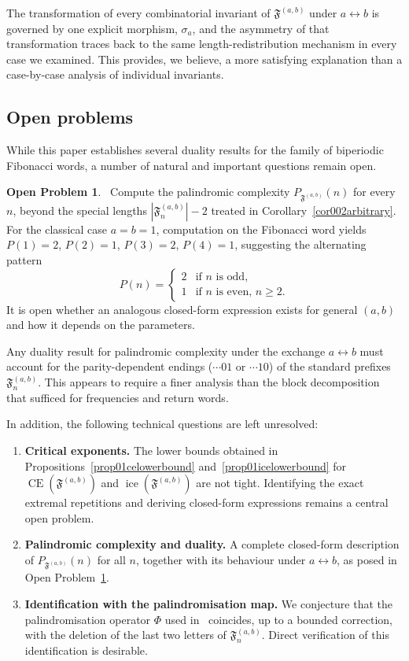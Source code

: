 \documentclass[12pt]{amsart}
\theoremstyle{plain}
\theoremstyle{definition}
\newtheorem{openproblem}{Open Problem}
\theoremstyle{remark}
\newcommand{\CE}{\operatorname{CE}}
\newcommand{\ice}{\operatorname{ice}}
\newcommand{\FD}{\mathfrak{F}}
\begin{document}
The transformation of every combinatorial invariant of $\FD^{(a,b)}$ under
$a\leftrightarrow b$ is governed by one explicit morphism, $\sigma_a$,
and the asymmetry of that transformation traces back to the same
length-redistribution mechanism in every case we examined. This provides,
we believe, a more satisfying explanation than a case-by-case analysis of
individual invariants.

\subsection{Open problems}

While this paper establishes several duality results for the family of biperiodic Fibonacci words, a number of natural and important questions remain open.

\begin{openproblem}~\label{op03palcomplexity}
Compute the palindromic complexity $P_{\FD^{(a,b)}}(n)$ for every $n$, beyond the special lengths $|\FD^{(a,b)}_n|-2$ treated in Corollary~\ref{cor002arbitrary}. 
For the classical case $a=b=1$, computation on the Fibonacci word yields $P(1)=2$, $P(2)=1$, $P(3)=2$, $P(4)=1$, suggesting the alternating pattern
\[
  P(n) = 
  \begin{cases}
    2 & \text{if $n$ is odd}, \\
    1 & \text{if $n$ is even, $n\geqslant 2$}.
  \end{cases}
\]
It is open whether an analogous closed-form expression exists for general $(a,b)$ and how it depends on the parameters.
\end{openproblem}

Any duality result for palindromic complexity under the exchange $a\leftrightarrow b$ must account for the parity-dependent endings ($\cdots 01$ or $\cdots 10$) of the standard prefixes $\FD^{(a,b)}_n$. This appears to require a finer analysis than the block decomposition that sufficed for frequencies and return words.

In addition, the following technical questions are left unresolved:

\begin{enumerate}
\item \textbf{Critical exponents.} 
  The lower bounds obtained in Propositions~\ref{prop01celowerbound} and~\ref{prop01icelowerbound} for $\CE(\FD^{(a,b)})$ and $\ice(\FD^{(a,b)})$ are not tight. Identifying the exact extremal repetitions and deriving closed-form expressions remains a central open problem.

\item \textbf{Palindromic complexity and duality.} 
  A complete closed-form description of $P_{\FD^{(a,b)}}(n)$ for all $n$, together with its behaviour under $a\leftrightarrow b$, as posed in Open Problem~\ref{op03palcomplexity}.

\item \textbf{Identification with the palindromisation map.} 
  We conjecture that the palindromisation operator $\Phi$ used in~\cite{Ramirez2015} coincides, up to a bounded correction, with the deletion of the last two letters of $\FD^{(a,b)}_n$. Direct verification of this identification is desirable.
\end{enumerate}
\end{document}
